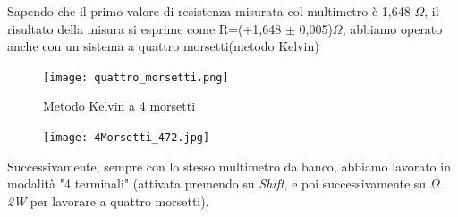 \begin{table}[!ht]
    \caption{Multimetro 34401A (6$\sfrac{1}{2}$ cifre), 2 Morsetti, R (dei morsetti) = 0,133 $\Omega$}
    \label{tab:mult_2w}
\end{table}
\FloatBarrier

 Sapendo che il primo valore di resistenza misurata col multimetro è 1,648 $\Omega$, il risultato della misura si esprime come R=(+1,648 $\pm$ 0,005)$\Omega$, abbiamo operato anche con un sistema a quattro morsetti(metodo Kelvin)


\begin{figure}[h]
    \centering
    \texttt{[image: quattro\_morsetti.png]}
    \caption{Metodo Kelvin a 4 morsetti}
    \label{fig:quattro morsetti}
\end{figure}
\FloatBarrier



\begin{figure}
    \centering
    \texttt{[image: 4Morsetti\_472.jpg]}
    \label{fig:4morsetti}
\end{figure}
\FloatBarrier
Successivamente, sempre con lo stesso multimetro da banco, abbiamo lavorato in modalità "4 terminali" (attivata premendo su \emph{Shift}, e poi successivamente su \emph{$\Omega$2W} per lavorare a quattro morsetti).


